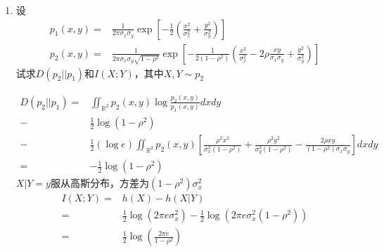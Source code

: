 \documentclass[a4paper]{article}
\begin{document}
\begin{enumerate}
\item 设
\begin{align*}
p_1(x,y)=& \frac{1}{2\pi \sigma_x\sigma_y}\exp[-\frac{1}{2}(\frac{x^2}{\sigma_x^2}+\frac{y^2}{\sigma_y^2})]\\
p_2(x,y)=& \frac{1}{2\pi \sigma_x\sigma_y\sqrt{1-\rho^2}}\exp[-\frac{1}{2(1-\rho^2)}(\frac{x^2}{\sigma_x^2}-2\rho\frac{xy}{\sigma_x\sigma_y}+\frac{y^2}{\sigma_y^2})]
\end{align*}
试求$D(p_2||p_1)$和$I(X;Y)$，其中$X,Y\sim p_2$
\begin{solution}
\begin{align*}
D(p_2||p_1) = & \iint_{\mathbb{R}^2} p_2(x,y)\log \frac{p_2(x,y)}{p_1(x,y)}dxdy \\
 -&\frac{1}{2}\log(1-\rho^2)\\
-&\frac{1}{2}(\log e)\iint_{\mathbb{R}^2} p_2(x,y)\left[\frac{\rho^2 x^2}{\sigma_x^2(1-\rho^2)}+\frac{\rho^2 y^2}{\sigma_y^2(1-\rho^2)}-\frac{2\rho xy}{(1-\rho^2)\sigma_x\sigma_y}\right]dxdy\\
=&-\frac{1}{2}\log(1-\rho^2)
\end{align*}
$X|Y=y$服从高斯分布，方差为$(1-\rho^2)\sigma_x^2$
\begin{align*}
I(X;Y) = & h(X)-h(X|Y)\\
= & \frac{1}{2}\log(2\pi e \sigma_x^2) - \frac{1}{2}\log(2\pi e \sigma_x^2(1-\rho^2))\\
= & \frac{1}{2}\log(\frac{2\pi e}{1-\rho^2})
\end{align*}

\end{solution}

\end{enumerate}
\end{document}
